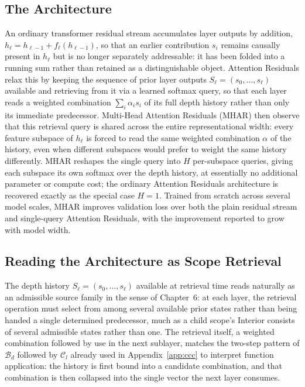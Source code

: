 \documentclass[11pt,twoside,openright]{book}
\numberwithin{equation}{chapter}
\theoremstyle{definition}
\theoremstyle{plain}
\theoremstyle{remark}
\theoremstyle{definition}
\newcommand{\Bind}{\mathcal{B}_d}
\newcommand{\Collapse}{\mathcal{C}_l}
\begin{document}
\subsection{The Architecture}

An ordinary transformer residual stream accumulates layer outputs by
addition, $h_\ell=h_{\ell-1}+f_\ell(h_{\ell-1})$, so that an earlier
contribution $s_i$ remains causally present in $h_\ell$ but is no longer
separately addressable: it has been folded into a running sum rather than
retained as a distinguishable object. Attention Residuals
\citep{Luo2026} relax this by keeping the sequence of prior layer outputs
$S_\ell=(s_0,\ldots,s_\ell)$ available and retrieving from it via a
learned softmax query, so that each layer reads a weighted combination
$\sum_i\alpha_i s_i$ of its full depth history rather than only its
immediate predecessor. Multi-Head Attention Residuals (MHAR) then
observe that this retrieval query is shared across the entire
representational width: every feature subspace of $h_\ell$ is forced to
read the same weighted combination $\alpha$ of the history, even when
different subspaces would prefer to weight the same history differently.
MHAR reshapes the single query into $H$ per-subspace queries, giving each
subspace its own softmax over the depth history, at essentially no
additional parameter or compute cost; the ordinary Attention Residuals
architecture is recovered exactly as the special case $H=1$. Trained
from scratch across several model scales, MHAR improves validation loss
over both the plain residual stream and single-query Attention Residuals,
with the improvement reported to grow with model width.

\subsection{Reading the Architecture as Scope Retrieval}

The depth history $S_\ell=(s_0,\ldots,s_\ell)$ available at retrieval
time reads naturally as an admissible source family in the sense of
Chapter~6: at each layer, the retrieval operation must select from among
several available prior states rather than being handed a single
determined predecessor, much as a child scope's Interior consists of
several admissible states rather than one. The retrieval itself, a
weighted combination followed by use in the next sublayer, matches the
two-step pattern of $\Bind$ followed by $\Collapse$ already used in
Appendix~\ref{app:ccc} to interpret function application: the history is
first bound into a candidate combination, and that combination is then
collapsed into the single vector the next layer consumes.
\end{document}
